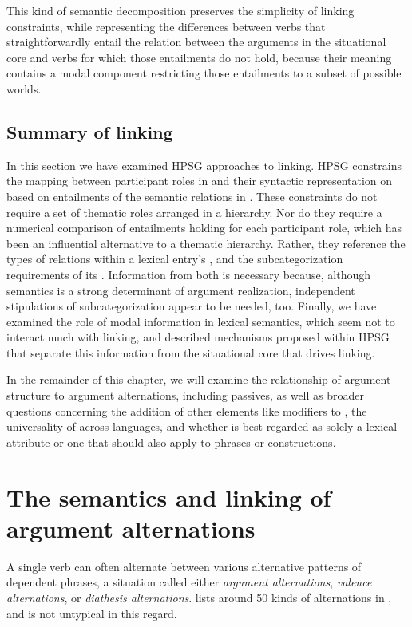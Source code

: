 \documentclass[output=paper,biblatex,babelshorthands,newtxmath,draftmode,colorlinks, citecolor=brown]{langscibook}
\begin{document}
 
This kind of semantic decomposition preserves the simplicity of linking constraints, while representing the differences between verbs that straightforwardly entail the relation between the arguments in the situational core and verbs for which those entailments do not hold, because their meaning contains a modal component restricting those entailments to a subset of possible worlds.

\subsection{Summary of linking}

In this section we have examined HPSG approaches to linking.  HPSG constrains the mapping between
participant roles in
 and their syntactic representation on \argst based on entailments of the semantic
relations in .  These constraints do not require a set of thematic roles arranged in a
hierarchy.  Nor do they require a numerical comparison of entailments holding for each participant
role, which has been an influential alternative to a thematic hierarchy.  Rather, they reference the
types of relations within a lexical entry's , and the subcategorization requirements of
its \argst.  Information from both is necessary because, although semantics is a strong determinant
of argument realization, independent stipulations of subcategorization appear to be needed, too.
Finally, we have examined the role of modal information in lexical semantics, which seem not to
interact much with linking, and described mechanisms proposed within HPSG that separate this
information from the situational core that drives linking.

In the remainder of this chapter, we will examine the relationship of argument structure to argument
alternations, including passives, as well as broader questions concerning the addition of other
elements like modifiers to \argst, the universality of \argst across languages, and whether \argst
is best regarded as solely a lexical attribute or one that should also apply to phrases or
constructions.


\section{The semantics and linking of argument alternations}
\label{alternations}
A single verb can often alternate between
 various alternative patterns of dependent phrases, a situation called either 
\emph{argument alternations},
\emph{valence alternations}, or \emph{diathesis alternations}.
\citet{Levin1993} lists around 50 kinds of alternations in , and  is not untypical in this regard.
\end{document}
